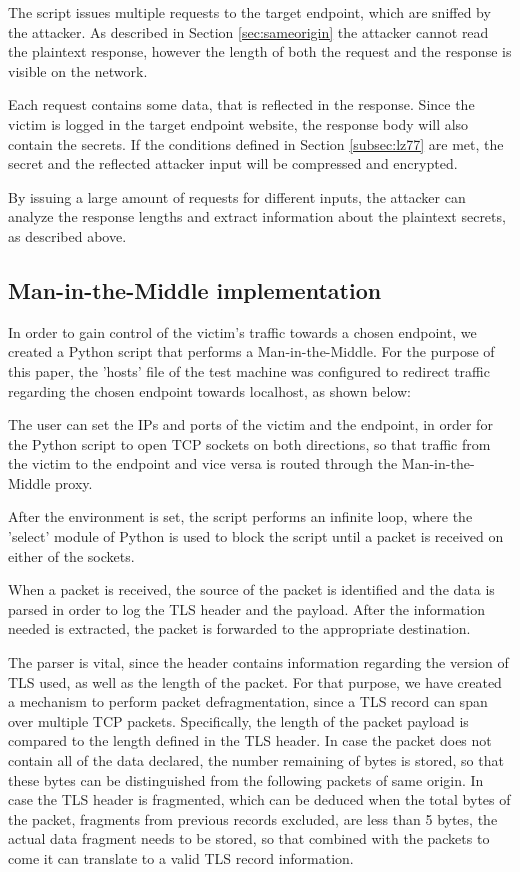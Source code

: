 The script issues multiple requests to the target endpoint, which are sniffed by
the attacker. As described in Section \ref{sec:sameorigin} the attacker cannot
read the plaintext response, however the length of both the request and the
response is visible on the network.

Each request contains some data, that is reflected in the response. Since the
victim is logged in the target endpoint website, the response body will also
contain the secrets. If the conditions defined in Section \ref{subsec:lz77} are
met, the secret and the reflected attacker input will be compressed and
encrypted.

By issuing a large amount of requests for different inputs, the attacker can
analyze the response lengths and extract information about the plaintext
secrets, as described above.

\subsection{Man-in-the-Middle implementation}

In order to gain control of the victim's traffic towards a chosen endpoint, we
created a Python script that performs a Man-in-the-Middle. For the purpose of
this paper, the 'hosts' file of the test machine was configured to redirect
traffic regarding the chosen endpoint towards localhost, as shown below:


The user can set the IPs and ports of the victim and the endpoint, in order for
the Python script to open TCP sockets on both directions, so that traffic from
the victim to the endpoint and vice versa is routed through the
Man-in-the-Middle proxy.

After the environment is set, the script performs an infinite loop, where the
'select' module of Python is used to block the script until a packet is received
on either of the sockets.

When a packet is received, the source of the packet is identified and the data
is parsed in order to log the TLS header and the payload. After the information
needed is extracted, the packet is forwarded to the appropriate destination.

The parser is vital, since the header contains information regarding the version
of TLS used, as well as the length of the packet. For that purpose, we have
created a mechanism to perform packet defragmentation, since a TLS record can
span over multiple TCP packets. Specifically, the length of the packet payload
is compared to the length defined in the TLS header. In case the packet does not
contain all of the data declared, the number remaining of bytes is stored, so
that these bytes can be distinguished from the following packets of same origin.
In case the TLS header is fragmented, which can be deduced when the total bytes
of the packet, fragments from previous records excluded, are less than 5 bytes,
the actual data fragment needs to be stored, so that combined with the packets
to come it can translate to a valid TLS record information.

